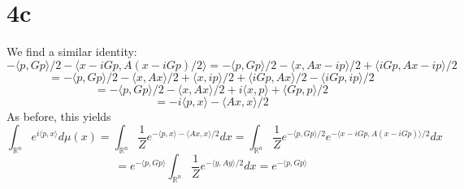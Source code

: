 \documentclass{article}
\begin{document}
\section*{4c}
We find a similar identity:
\[
  -\langle p,Gp \rangle/2-\langle x-iGp,A(x-iGp)/2 \rangle
  =-\langle p,Gp  \rangle/2-\langle x,Ax-ip \rangle/2+\langle iGp,Ax-ip \rangle/2
\]
\[
  =-\langle p,Gp \rangle/2 - \langle x,Ax \rangle/2+\langle x,ip \rangle/2+\langle iGp,Ax \rangle/2-\langle iGp,ip \rangle/2
\]
\[
  =-\langle p,Gp \rangle/2-\langle x,Ax\rangle/2+ i\langle x,p \rangle + \langle Gp,p \rangle/2
\]
\[
  =-i\langle p,x \rangle-\langle Ax,x \rangle/2
\]
As before, this yields
\[
  \int_{\mathbb{R}^{n}}e^{i\langle p,x \rangle}d\mu(x)
  =\int_{\mathbb{R}^{n}}\frac{1}{Z}e^{-\langle p,x \rangle-\langle Ax,x \rangle/2}dx
  =\int_{\mathbb{R}^{n}}\frac{1}{Z}e^{-\langle p,Gp \rangle/2}e^{-\langle x-iGp,A(x-iGp) \rangle/2}dx
\]
\[
  =e^{-\langle p,Gp \rangle}\int_{\mathbb{R}^{n}}\frac{1}{Z}e^{-\langle y,Ay \rangle/2}dx
  =e^{-\langle p,Gp \rangle}
\]
\end{document}
